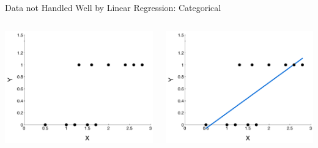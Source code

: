 \documentclass[aspectratio=169]{beamer}
\begin{document}
\begin{frame}{Data not Handled Well by Linear Regression: Categorical}
\begin{columns}
\begin{column}{0.5\textwidth}
     \includegraphics[width=1\textwidth]{lectLR/catData.pdf} 
 \end{column}
\begin{column}{0.5\textwidth}
     \includegraphics[width=1\textwidth]{lectLR/catDataWithLine.pdf} 
\end{column}
 \end{columns}

\end{frame}
\end{document}
